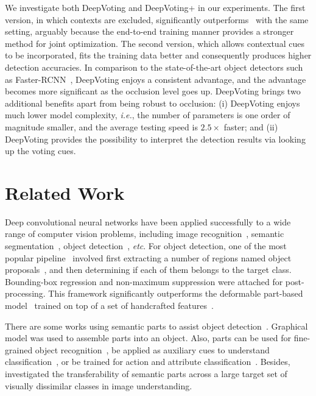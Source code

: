 \documentclass[10pt,twocolumn,letterpaper]{article}
\begin{document}
  We investigate both DeepVoting and DeepVoting+ in our experiments. The first version, in which contexts are excluded, significantly outperforms~\cite{wang2017detecting} with the same setting, arguably because the end-to-end training manner provides a stronger method for joint optimization. The second version, which allows contextual cues to be incorporated, fits the training data better and consequently produces higher detection accuracies. In comparison to the state-of-the-art object detectors such as Faster-RCNN~\cite{Ren_2015_Faster}, DeepVoting enjoys a consistent advantage, and the advantage becomes more significant as the occlusion level goes up. DeepVoting brings two additional benefits apart from being robust to occlusion: (i) DeepVoting enjoys much lower model complexity, {\em i.e.}, the number of parameters is one order of magnitude smaller, and the average testing speed is $2.5\times$ faster; and (ii) DeepVoting provides the possibility to interpret the detection results via looking up the voting cues.



  \section{Related Work}
  \label{RelatedWork}

  Deep convolutional neural networks have been applied successfully to a wide range of computer vision problems, including image recognition~\cite{Krizhevsky_2012_ImageNet,Simonyan_2015_Very,Szegedy_2015_Going,He_2016_Deep}, semantic segmentation~\cite{Long_2015_Fully,Chen_2016_DeepLab,Zheng_2015_Conditional}, object detection~\cite{Girshick_2015_Fast,Ren_2015_Faster,redmon2016you,liu2016ssd,zhang2017single}, {\em etc}. For object detection, one of the most popular pipeline~\cite{Girshick_2015_Fast,Ren_2015_Faster} involved first extracting a number of regions named object proposals~\cite{Alexe_2012_Measuring,Uijlings_2013_Selective,kuo2015deepbox,Ren_2015_Faster}, and then determining if each of them belongs to the target class. Bounding-box regression and non-maximum suppression were attached for post-processing. This framework significantly outperforms the deformable part-based model~\cite{Felzenszwalb_2010_Object} trained on top of a set of handcrafted features~\cite{Dalal_2005_Histograms}.

  There are some works using semantic parts to assist object detection~\cite{chen2014detect,Zhu_2015_DeePM}. Graphical model was used to assemble parts into an object. Also, parts can be used for fine-grained object recognition~\cite{Zhang_2014_Part, zhang2016spda}, be applied as auxiliary cues to understand classification~\cite{Huang_2016_Part}, or be trained for action and attribute classification~\cite{gkioxari2015actions}. Besides, \cite{novotny2016have} investigated the transferability of semantic parts across a large  target  set  of  visually  dissimilar  classes in image understanding.
\end{document}
